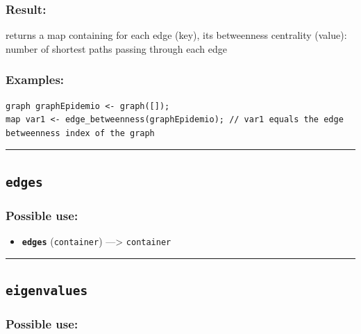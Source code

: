 \documentclass[]{book}
\providecommand{\tightlist}{%
  \setlength{\itemsep}{0pt}\setlength{\parskip}{0pt}}
\theoremstyle{definition}
\theoremstyle{definition}
\theoremstyle{definition}
\theoremstyle{remark}
\begin{document}
\subsubsection{Result:}\label{result-141}

returns a map containing for each edge (key), its betweenness centrality
(value): number of shortest paths passing through each edge

\subsubsection{Examples:}\label{examples-110}

\begin{verbatim}
graph graphEpidemio <- graph([]);  
map var1 <- edge_betweenness(graphEpidemio); // var1 equals the edge betweenness index of the graph
\end{verbatim}

\begin{center}\rule{0.5\linewidth}{\linethickness}\end{center}

\subsection{\texorpdfstring{\texttt{edges}}{edges}}\label{edges}

\subsubsection{Possible use:}\label{possible-use-147}

\begin{itemize}
\tightlist
\item
  \textbf{\texttt{edges}} (\texttt{container}) ---\textgreater{}
  \texttt{container}
\end{itemize}

\begin{center}\rule{0.5\linewidth}{\linethickness}\end{center}

\subsection{\texorpdfstring{\texttt{eigenvalues}}{eigenvalues}}\label{eigenvalues}

\subsubsection{Possible use:}\label{possible-use-148}
\end{document}
